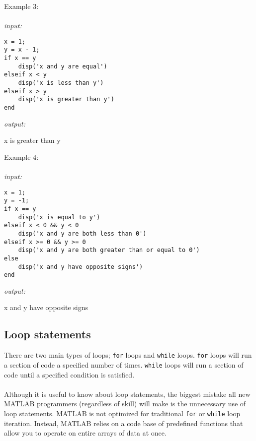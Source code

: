 \documentclass[../MATLAB_Primer.tex]{subfiles}
\begin{document}
Example 3:
\\ \\
\textit{input:}
\begin{lstlisting}[frame=single]
x = 1;
y = x - 1;
if x == y
    disp('x and y are equal')
elseif x < y
    disp('x is less than y')
elseif x > y
    disp('x is greater than y')
end
\end{lstlisting}

\textit{output:}

\begin{center}
    x is greater than y
\end{center}

Example 4:
\\ \\
\textit{input:}
\begin{lstlisting}[frame=single]
x = 1;
y = -1;
if x == y
    disp('x is equal to y')
elseif x < 0 && y < 0
    disp('x and y are both less than 0')
elseif x >= 0 && y >= 0
    disp('x and y are both greater than or equal to 0')
else
    disp('x and y have opposite signs')
end
\end{lstlisting}

\textit{output:}

\begin{center}
    x and y have opposite signs
\end{center}

\subsection{Loop statements} \label{Loop Statements}
There are two main types of loops; \texttt{for} loops and \texttt{while} loops. \texttt{for} loops will run a section of code a specified number of times. \texttt{while} loops will run a section of code until a specified condition is satisfied. 
\\ \\
Although it is useful to know about loop statements, the biggest mistake all new MATLAB programmers (regardless of skill) will make is the unnecessary use of loop statements. MATLAB is not optimized for traditional \texttt{for} or \texttt{while} loop iteration. Instead, MATLAB relies on a code base of predefined functions that allow you to operate on entire arrays of data at once.
\end{document}
